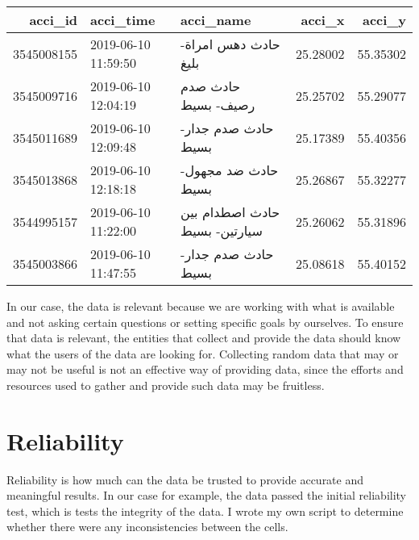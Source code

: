 \documentclass[
]{book}
\newenvironment{Shaded}{\begin{snugshade}}{\end{snugshade}}
\newcommand{\ControlFlowTok}[1]{\textcolor[rgb]{0.13,0.29,0.53}{\textbf{#1}}}
\newcommand{\DecValTok}[1]{\textcolor[rgb]{0.00,0.00,0.81}{#1}}
\newcommand{\KeywordTok}[1]{\textcolor[rgb]{0.13,0.29,0.53}{\textbf{#1}}}
\newcommand{\NormalTok}[1]{#1}
\newcommand{\OperatorTok}[1]{\textcolor[rgb]{0.81,0.36,0.00}{\textbf{#1}}}
\newcommand{\StringTok}[1]{\textcolor[rgb]{0.31,0.60,0.02}{#1}}
\begin{document}
\begin{tabular}{r|l|l|r|r}
\hline
acci\_id & acci\_time & acci\_name & acci\_x & acci\_y\\
\hline
3545008155 & 2019-06-10 11:59:50 & حادث دهس امراة- بليغ & 25.28002 & 55.35302\\
\hline
3545009716 & 2019-06-10 12:04:19 & حادث صدم رصيف- بسيط & 25.25702 & 55.29077\\
\hline
3545011689 & 2019-06-10 12:09:48 & حادث صدم جدار- بسيط & 25.17389 & 55.40356\\
\hline
3545013868 & 2019-06-10 12:18:18 & حادث ضد مجهول- بسيط & 25.26867 & 55.32277\\
\hline
3544995157 & 2019-06-10 11:22:00 & حادث اصطدام بين سيارتين- بسيط & 25.26062 & 55.31896\\
\hline
3545003866 & 2019-06-10 11:47:55 & حادث صدم جدار- بسيط & 25.08618 & 55.40152\\
\hline
\end{tabular}

In our case, the data is relevant because we are working with what is available and not asking certain questions or setting specific goals by ourselves. To ensure that data is relevant, the entities that collect and provide the data should know what the users of the data are looking for. Collecting random data that may or may not be useful is not an effective way of providing data, since the efforts and resources used to gather and provide such data may be fruitless.

\hypertarget{reliability}{%
\section{Reliability}\label{reliability}}

Reliability is how much can the data be trusted to provide accurate and meaningful results. In our case for example, the data passed the initial reliability test, which is tests the integrity of the data. I wrote my own script to determine whether there were any inconsistencies between the cells.

\begin{Shaded}
\end{Shaded}
\end{document}
